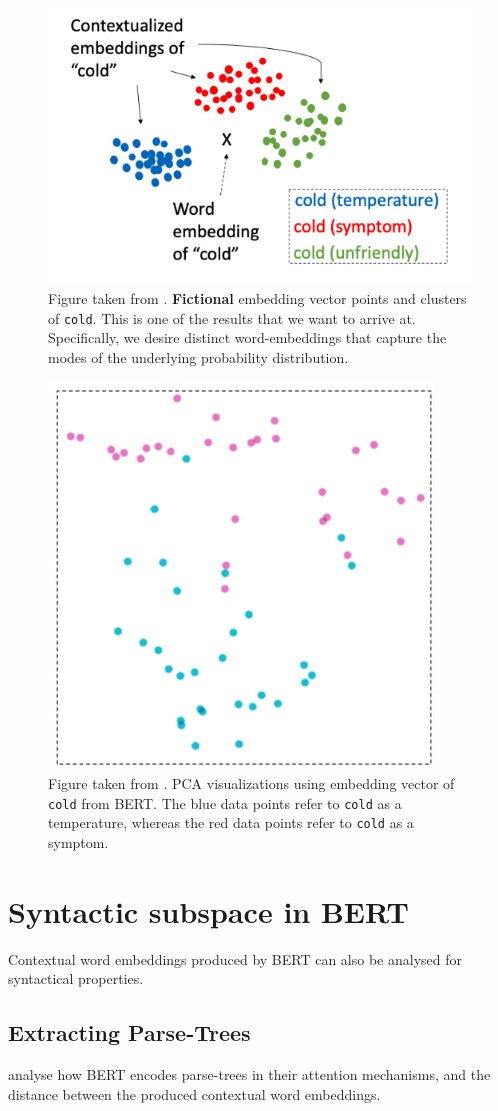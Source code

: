 \documentclass[a4paper,12pt,oneside,openright]{report}
\begin{document}
\begin{figure}[H]
	\center
  \includegraphics[width=0.4\linewidth]{./assets/relatedwork/cold_fictional_desired.png}
  \caption{Figure taken from \cite{si19}. \textbf{Fictional} embedding vector points and clusters of \texttt{cold}. This is one of the results that we want to arrive at.
  Specifically, we desire distinct word-embeddings that capture the modes of the underlying probability distribution. }
  \label{fig:cold_fictional_desired}
\end{figure}

\begin{figure}[H]
	\center
  \includegraphics[width=0.3\linewidth]{./assets/relatedwork/cold_biobert.png}
  \caption{Figure taken from \cite{si19}. PCA visualizations using embedding vector of \texttt{cold} from BERT. The blue data points refer to \texttt{cold} as a temperature, whereas the red data points refer to \texttt{cold} as a symptom.}
  \label{fig:cold_fictional_desired}
\end{figure}


\section{Syntactic subspace in BERT}

Contextual word embeddings produced by BERT can also be analysed for syntactical properties.

\subsection{Extracting Parse-Trees}

\cite{coenen19, jawahar19} analyse how BERT encodes parse-trees in their attention mechanisms, and the distance between the produced contextual word embeddings. \\
\end{document}
